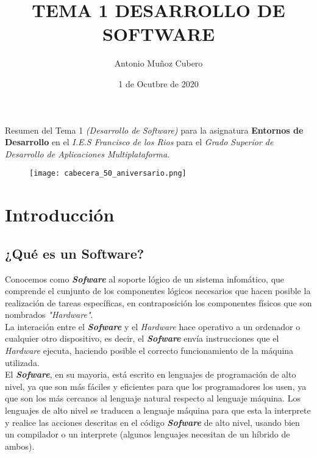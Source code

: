 \documentclass{article}
\title{TEMA 1 DESARROLLO DE SOFTWARE}
\author{Antonio Muñoz Cubero}
\date{1 de Ocutbre de 2020}
\begin{document}
\maketitle
{}


Resumen del Tema 1 \textit{(Desarrollo de Software)} para la asignatura \textbf{Entornos de Desarrollo} en el 
\textit{I.E.S Francisco de los Rios} para el \textit{Grado Superior de Desarrollo de Aplicaciones Multiplataforma}.

\begin{figure}[b]
    \texttt{[image: cabecera\_50\_aniversario.png]}
    \centering    
\end{figure}

\newpage

    \tableofcontents

\newpage
{}

\section{Introducción}
\subsection{¿Qué es un Software?}

Conocemos como \textbf{\textit{Sofware}} al soporte lógico de un sistema infomático, que comprende el cunjunto de los
componentes lógicos necesarios que hacen posible la realización de tareas específicas, en contraposición
los componentes físicos que son nombrados \textit{"Hardware"}.\\

La interación entre el \textbf{\textit{Sofware}} y el \textit{Hardware} hace operativo a un ordenador o cualquier otro 
dispositivo, es decir, el \textbf{\textit{Sofware}} envía instrucciones que el \textit{Hardware} ejecuta, haciendo posible 
el correcto funcionamiento de la máquina utilizada.\\

El \textbf{\textit{Sofware}}, en su mayoria, está escrito en lenguajes de programación de alto nivel, ya que son más fáciles
y eficientes para que los programadores los usen, ya que son los más cercanos al lenguaje natural respecto al lenguaje máquina.
Los lenguajes de alto nivel se traducen a lenguaje máquina para que esta la interprete y realice las acciones descritas en el código
\textbf{\textit{Sofware}} de alto nivel, usando bien un compilador o un interprete (algunos lenguajes necesitan de un híbrido de ambos).
\end{document}
